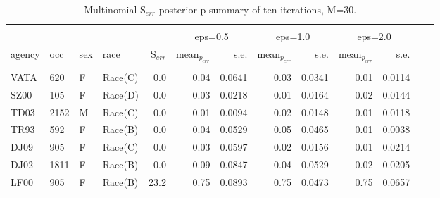 \documentclass[10pt, letterpaper]{article}
\begin{document}
\begin{spacing}{1.0}
\begin{table}[h!]
    \centering
    \caption{Multinomial $\text{S}_{err}$ posterior p summary of ten iterations, M=30.}
    \label{table:mnerr-M30}
    \begin{tabular}{llllrrrrrrrrr}
        \hline\\[-10pt]
        & & & & & \multicolumn{2}{c}{eps=0.5} & \multicolumn{2}{c}{eps=1.0} & \multicolumn{2}{c}{eps=2.0} \\
        agency & occ & sex & race & $\text{S}_{err}$ & $\text{mean}_{p_{err}}$ & s.e. & $\text{mean}_{p_{err}}$ & s.e. & $\text{mean}_{p_{err}}$ & s.e. \\ 
        \hline\\[-6pt]
        VATA & 620 & F & Race(C) & 0.0 & 0.04 & 0.0641 & 0.03 & 0.0341 & 0.01 & 0.0114 \\ 
        SZ00 & 105 & F & Race(D) & 0.0 & 0.03 & 0.0218 & 0.01 & 0.0164 & 0.02 & 0.0144 \\ 
        TD03 & 2152 & M & Race(C) & 0.0 & 0.01 & 0.0094 & 0.02 & 0.0148 & 0.01 & 0.0118 \\ 
        TR93 & 592 & F & Race(B) & 0.0 & 0.04 & 0.0529 & 0.05 & 0.0465 & 0.01 & 0.0038 \\ 
        DJ09 & 905 & F & Race(C) & 0.0 & 0.03 & 0.0597 & 0.02 & 0.0156 & 0.01 & 0.0214 \\ 
        DJ02 & 1811 & F & Race(B) & 0.0 & 0.09 & 0.0847 & 0.04 & 0.0529 & 0.02 & 0.0205 \\ 
        LF00 & 905 & F & Race(B) & 23.2 & 0.75 & 0.0893 & 0.75 & 0.0473 & 0.75 & 0.0657 \\ 
        \hline
    \end{tabular}
\end{table}


\end{spacing}
\end{document}
